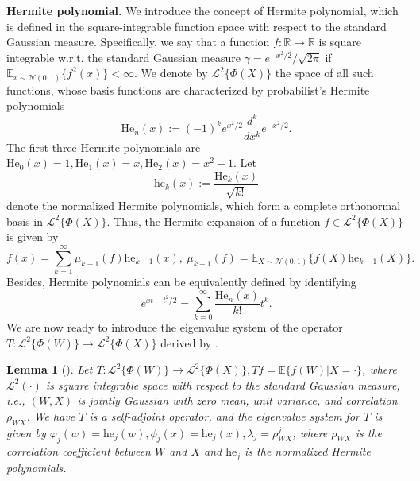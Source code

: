 \documentclass[
  12pt]{article}
\newtheorem{lemma}{Lemma}
\def\to{\rightarrow}
\def\cN{\mathcal{N}}
\begin{document}
\textbf{Hermite polynomial.} We introduce the concept of Hermite polynomial, which is defined in the square-integrable function space with respect to the standard Gaussian measure. Specifically, we say that a function $f: \mathbb{R}\to \mathbb{R}$ is square integrable w.r.t. the standard Gaussian measure $\gamma=e^{-x^2/2}/\sqrt{2\pi}$ if $\mathbb{E}_{x\sim \cN(0,1)}\{f^2(x)\}<\infty$. We denote by $\mathcal{L}^2\{\Phi(X)\}$ the space of all such functions, whose basis functions are characterized by probabilist’s Hermite polynomials
\begin{equation}
\label{eq.Hermite}
    \mathrm{He}_{n}(x):=(-1)^ke^{x^2/2}\frac{d^k}{dx^k}e^{-x^2/2}.
\end{equation}
The first three Hermite polynomials are $\mathrm{He}_{0}(x)=1,\mathrm{He}_{1}(x)=x,\mathrm{He}_{2}(x)=x^2-1$. Let 
\begin{equation}
\label{eq.Hermite_norm}
    \mathrm{he}_{k}(x):=\frac{\mathrm{He}_{k}(x)}{\sqrt{k!}}
\end{equation}
denote the normalized Hermite polynomials, which form a complete orthonormal basis in $\mathcal{L}^2\{\Phi(X)\}$. Thus, the Hermite expansion of a function $f\in \mathcal{L}^2\{\Phi(X)\}$ is given by
$$
f(x)=\sum_{k=1}^{\infty}\mu_{k-1}(f)\mathrm{he}_{k-1}(x), \ \mu_{k-1}(f)=\mathbb{E}_{X\sim\mathcal{N}(0,1)}\{f(X)\mathrm{he}_{k-1}(X)\}.
$$
Besides, Hermite polynomials can be equivalently defined by identifying 
\begin{equation}\label{eq.Hermite_generate}
    e^{xt-t^2/2}=\sum_{k=0}^\infty\frac{\mathrm{He}_{n}(x)}{k!}t^k.
\end{equation}
We are now ready to introduce the eigenvalue system of the operator $T: \mathcal{L}^2\{\Phi(W)\} \rightarrow  \mathcal{L}^2\{\Phi(X)\}$ derived by \cite{carrasco2007linear}. 
\begin{lemma}[\cite{carrasco2007linear}]\label{lem.self-adjoint operator}
    Let $T: \mathcal{L}^2\{\Phi(W)\}\rightarrow  \mathcal{L}^2\{\Phi(X)\}, Tf =\mathbb{E}\{ f(W)|X=\cdot\}$, where $\mathcal{L}^2(\cdot)$ is square integrable space with respect to the standard Gaussian measure, \emph{i.e.}, $(W, X)$ is jointly Gaussian with zero mean, unit variance, and correlation $\rho_{WX}$. We have $T$ is a self-adjoint operator, and the eigenvalue system for $T$ is given by $\varphi_j(w)=\mathrm{he}_{j}(w),\phi_j(x)=\mathrm{he}_{j}(x),\lambda_j=\rho_{WX}^{j}$, where $\rho_{WX}$ is the correlation coefficient between $W$ and $X$ and $\mathrm{he}_{j}$ is the normalized Hermite polynomials.    
\end{lemma}
\end{document}
